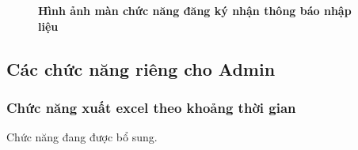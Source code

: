\begin{figure}[H]
  \centering
  \hfill
  \caption[Hình ảnh màn chức năng đăng ký nhận thông báo nhập liệu]{\bfseries \fontsize{12pt}{0pt}
  \selectfont Hình ảnh màn chức năng đăng ký nhận thông báo nhập liệu}
  \label{select_time_remind_waznet}
\end{figure}

\subsection{Các chức năng riêng cho Admin}
\subsubsection{Chức năng xuất excel theo khoảng thời gian}
Chức năng đang được bổ sung.
\newpage